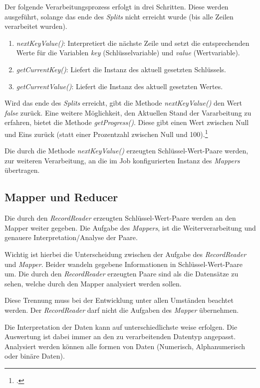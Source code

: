Der folgende Verarbeitungsprozess erfolgt in drei Schritten. Diese werden ausgeführt, solange das ende des \textit{Splits} nicht erreicht wurde (bis alle Zeilen verarbeitet wurden).

\begin{enumerate}
\item \textit{nextKeyValue()}: Interpretiert die nächste Zeile und setzt die entsprechenden Werte für die Variablen \textit{key} (Schlüsselvariable) und \textit{value} (Wertvariable).
\item \textit{getCurrentKey()}: Liefert die Instanz des aktuell gesetzten Schlüssels.
\item \textit{getCurrentValue()}: Liefert die Instanz des aktuell gesetzten Wertes.
\end{enumerate} 

Wird das ende des \textit{Splits} erreicht, gibt die Methode \textit{nextKeyValue()} den Wert \textit{false} zurück. Eine weitere Möglichkeit, den Aktuellen Stand der Vararbeitung zu erfahren, bietet die Methode \textit{getProgress()}. Diese gibt einen Wert zwischen Null und Eins zurück (statt einer Prozentzahl zwischen Null und 100).\footcite[Vgl.][S. 117 f.]{Freiknecht.2014}

Die durch die Methode \textit{nextKeyValue()} erzeugten Schlüssel-Wert-Paare werden, zur weiteren Verarbeitung, an die im Job konfigurierten Instanz des \textit{Mappers} übertragen. 

\subsection{Mapper und Reducer}
Die durch den \textit{RecordReader} erzeugten Schlüssel-Wert-Paare werden an den Mapper weiter gegeben. Die Aufgabe des \textit{Mappers}, ist die Weiterverarbeitung und genauere Interpretation/Analyse der Paare.

Wichtig ist hierbei die Unterscheidung zwischen der Aufgabe des \textit{RecordReader} und \textit{Mapper}. Beider wandeln gegebene Informationen in Schlüssel-Wert-Paare um. Die durch den \textit{RecordReader} erzeugten Paare sind als die Datensätze zu sehen, welche durch den Mapper analysiert werden sollen.

Diese Trennung muss bei der Entwicklung unter allen Umständen beachtet werden. Der \textit{RecordReader} darf nicht die Aufgaben des \textit{Mapper} übernehmen.

Die Interpretation der Daten kann auf unterschiedlichste weise erfolgen. Die Auswertung ist dabei immer an den zu verarbeitenden Datentyp angepasst. Analysiert werden können alle formen von Daten (Numerisch, Alphanumerisch oder binäre Daten).

